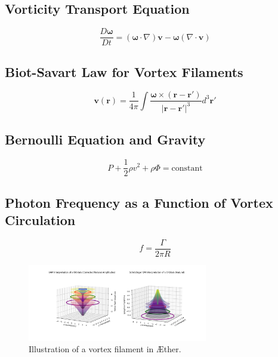 \documentclass[a4paper,10pt]{article}
\begin{document}
    \subsection{Vorticity Transport Equation}\label{subsec:vorticity-transport-equation}
    \begin{equation} \label{eq:vorticity}
        \frac{D\boldsymbol{\omega}}{Dt} = (\boldsymbol{\omega} \cdot \nabla) \mathbf{v} - \boldsymbol{\omega} (\nabla \cdot \mathbf{v})
    \end{equation}


    \subsection{Biot-Savart Law for Vortex Filaments}\label{subsec:biot-savart-law-for-vortex-filaments}
    \begin{equation}
        \mathbf{v}(\mathbf{r}) = \frac{1}{4\pi} \int \frac{\boldsymbol{\omega} \times (\mathbf{r} - \mathbf{r'})}{|\mathbf{r} - \mathbf{r'}|^3} d^3\mathbf{r'}\label{eq:equation}
    \end{equation}

    \subsection{Bernoulli Equation and Gravity}\label{subsec:bernoulli-equation-and-gravity}
    \begin{equation}
        P + \frac{1}{2} \rho v^2 + \rho \Phi = \text{constant}\label{eq:equation2}
    \end{equation}

    \subsection{Photon Frequency as a Function of Vortex Circulation}\label{subsec:photon-frequency-as-a-function-of-vortex-circulation}
    \begin{equation}
        f = \frac{\Gamma}{2\pi R}\label{eq:equation3}
    \end{equation}


    \begin{figure}[h]
        \centering
        \includegraphics[width=0.7\textwidth]{vortex_diagram}
        \caption{Illustration of a vortex filament in Æther.}
        \label{fig:vortex}
    \end{figure}
\end{document}
